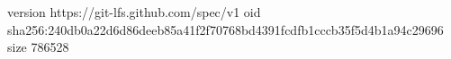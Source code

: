 version https://git-lfs.github.com/spec/v1
oid sha256:240db0a22d6d86deeb85a41f2f70768bd4391fcdfb1cccb35f5d4b1a94c29696
size 786528
